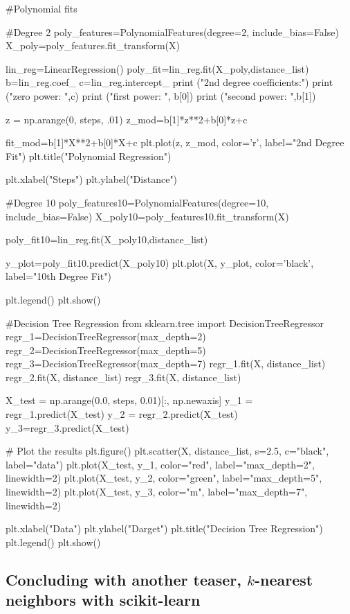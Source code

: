 \documentclass[%
oneside,                 %
final,                   %
10pt]{article}
\begin{document}
#Polynomial fits

#Degree 2
poly_features=PolynomialFeatures(degree=2, include_bias=False)
X_poly=poly_features.fit_transform(X)

lin_reg=LinearRegression()
poly_fit=lin_reg.fit(X_poly,distance_list)
b=lin_reg.coef_
c=lin_reg.intercept_
print ("2nd degree coefficients:")
print ("zero power: ",c)
print ("first power: ", b[0])
print ("second power: ",b[1])

z = np.arange(0, steps, .01)
z_mod=b[1]*z**2+b[0]*z+c

fit_mod=b[1]*X**2+b[0]*X+c
plt.plot(z, z_mod, color='r', label="2nd Degree Fit")
plt.title("Polynomial Regression")

plt.xlabel("Steps")
plt.ylabel("Distance")

#Degree 10
poly_features10=PolynomialFeatures(degree=10, include_bias=False)
X_poly10=poly_features10.fit_transform(X)

poly_fit10=lin_reg.fit(X_poly10,distance_list)

y_plot=poly_fit10.predict(X_poly10)
plt.plot(X, y_plot, color='black', label="10th Degree Fit")

plt.legend()
plt.show()


#Decision Tree Regression
from sklearn.tree import DecisionTreeRegressor
regr_1=DecisionTreeRegressor(max_depth=2)
regr_2=DecisionTreeRegressor(max_depth=5)
regr_3=DecisionTreeRegressor(max_depth=7)
regr_1.fit(X, distance_list)
regr_2.fit(X, distance_list)
regr_3.fit(X, distance_list)

X_test = np.arange(0.0, steps, 0.01)[:, np.newaxis]
y_1 = regr_1.predict(X_test)
y_2 = regr_2.predict(X_test)
y_3=regr_3.predict(X_test)

# Plot the results
plt.figure()
plt.scatter(X, distance_list, s=2.5, c="black", label="data")
plt.plot(X_test, y_1, color="red",
         label="max_depth=2", linewidth=2)
plt.plot(X_test, y_2, color="green", label="max_depth=5", linewidth=2)
plt.plot(X_test, y_3, color="m", label="max_depth=7", linewidth=2)

plt.xlabel("Data")
plt.ylabel("Darget")
plt.title("Decision Tree Regression")
plt.legend()
plt.show()

\epycod





\subsection{Concluding with another teaser, $k$-nearest neighbors with scikit-learn}
\end{document}

